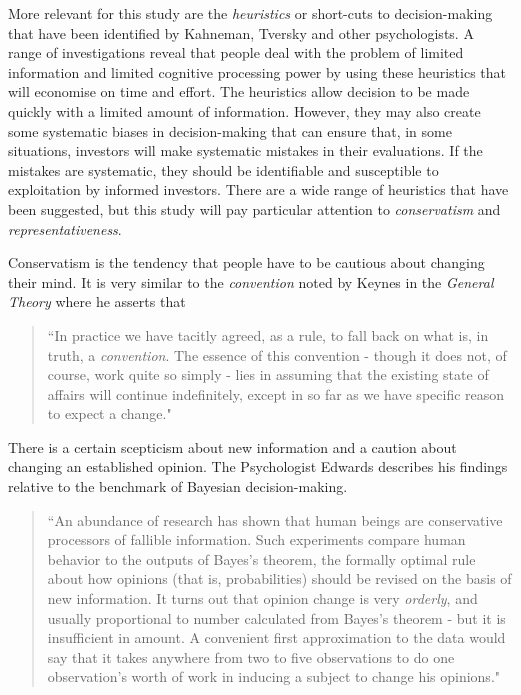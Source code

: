 \documentclass[12pt, a4paper, oneside]{article} %
\begin{document}
More relevant for this study are the \emph{heuristics} or short-cuts to decision-making that have been identified by Kahneman, Tversky and other psychologists.   A range of investigations reveal that people deal with the problem of limited information and limited cognitive processing power by using these heuristics  that will economise on time and effort.  The heuristics allow decision to be made quickly with a limited amount of information.  However, they may also create some systematic biases in decision-making that can ensure that, in some situations, investors will make systematic mistakes in their evaluations.  If the mistakes are systematic, they should be identifiable and susceptible to exploitation by informed investors.  There are a wide range of heuristics that have been suggested, but this study will pay particular attention to \emph{conservatism} and \emph{representativeness}.  

Conservatism is the tendency that people have to be cautious about changing their mind.  It is very similar to the \emph{convention} noted by Keynes in the \emph{General Theory} where he asserts that 
\begin{quotation}
``In practice we have tacitly agreed, as a rule, to fall back on what is, in truth, a \emph{convention}.  The essence of this convention - though it does not, of course, work quite so simply - lies in assuming that the existing state of affairs will continue indefinitely, except in so far as we have specific reason to expect a change."
\end{quotation}
\citep[p. 152]{Keynes1936}

There is a certain scepticism about new information and a caution about changing an established opinion. The Psychologist Edwards describes his findings relative to the benchmark of Bayesian decision-making.  
\begin{quotation}
``An abundance of research has shown that human beings are conservative processors of fallible information.  Such experiments compare human behavior to the outputs of Bayes's theorem, the formally optimal rule about how opinions (that is, probabilities) should be revised on the basis of new information.  It turns out that opinion change is very \emph{orderly}, and usually proportional to number calculated from Bayes's theorem  - but it is insufficient in amount.  A convenient first approximation to the data would say that it takes anywhere from two to five observations to do one observation's worth of work in inducing a subject to change his opinions."  
\end{quotation}
\citep[p. 359]{KahnemanUncertainty}  
\end{document}
